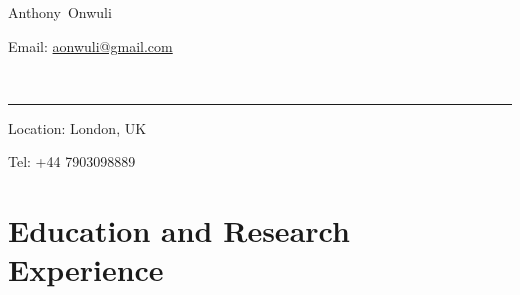\documentclass[11pt,a4paper]{article}
\makeatletter
\newcommand{\FirstName}{Anthony}
\newcommand{\LastName}{Onwuli}
\newcommand{\MyName}{\FirstName\ \LastName}
\newcommand{\Email}{aonwuli@gmail.com}
\newcommand{\PhoneNumber}{+44 7903098889}
\makeatother
\begin{document}
\begin{minipage}[t]{0.5\textwidth}
  {\fontsize{20pt}{0}\selectfont\MyName}
\end{minipage}
\begin{minipage}[t]{0.5\textwidth}
  \begin{flushright}
    Email: \href{mailto:\Email}{\Email}
  \end{flushright}
\end{minipage}
\\[-0.1cm]
\textcolor{lightgray}{\rule{\textwidth}{3pt}}
\begin{minipage}[t]{0.5\textwidth}
  Location: {London, UK}
\end{minipage}
\begin{minipage}[t]{0.5\textwidth}
  \begin{flushright}
  Tel: \PhoneNumber{}

  \end{flushright}
\end{minipage}
\vspace{-0.3cm}




\section{Education and Research Experience}
\end{document}
